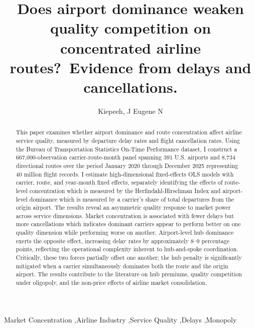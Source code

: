 \documentclass[preprint,12pt,authoryear]{elsarticle}
\begin{document}
\begin{frontmatter}

\title{\textbf{Does airport dominance weaken quality competition on concentrated airline routes?\ 
Evidence from delays and cancellations.}}

\author[inst1]{Kiepeeh, J Eugene N}

\begin{abstract}
    This paper examines whether airport dominance and route concentration affect airline service quality, measured by departure delay rates and flight cancellation rates. Using the Bureau of Transportation Statistics On-Time Performance dataset, I construct a 667,000-observation carrier-route-month panel spanning 391 U.S. airports and 8,734 directional routes over the period January 2020 through December 2025 representing 40 million flight records. I estimate high-dimensional fixed-effects OLS models with carrier, route, and year-month fixed effects, separately identifying the effects of route-level concentration which is measured by the Herfindahl-Hirschman Index and airport-level dominance which is measured by a carrier's share of total departures from the origin airport. The results reveal an asymmetric quality response to market power across service dimensions. Market concentration is associated with fewer delays but more cancellations which indicates dominant carriers appear to perform better on one quality dimension while performing worse on another. Airport-level hub dominance exerts the opposite effect, increasing delay rates by approximately 8–9 percentage points, reflecting the operational complexity inherent to hub-and-spoke coordination. Critically, these two forces partially offset one another; the hub penalty is significantly mitigated when a carrier simultaneously dominates both the route and the origin airport. The results contribute to the literature on hub premiums, quality competition under oligopoly, and the non-price effects of airline market consolidation.
    
\end{abstract}

\begin{keyword}
Market Concentration \sep Airline Industry \sep Service Quality \sep Delays \sep Monopoly
\end{keyword}

\end{frontmatter}
\end{document}
